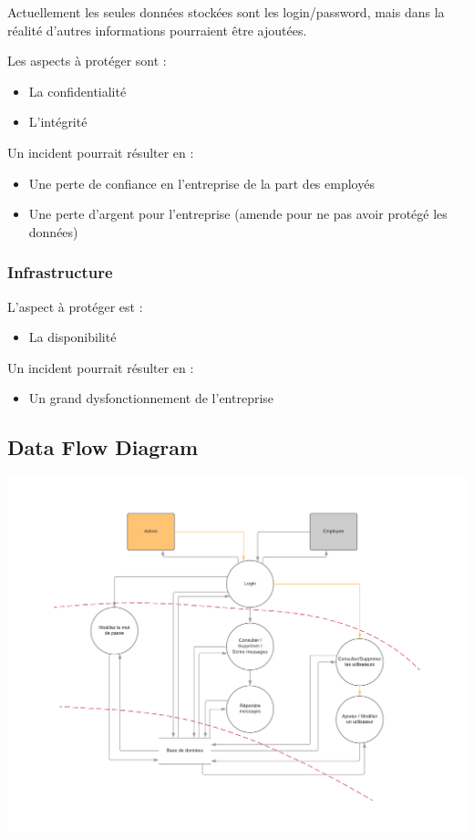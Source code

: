 \documentclass{article}
\begin{document}
Actuellement les seules données stockées sont les login/password, mais
dans la réalité d'autres informations pourraient être ajoutées.

Les aspects à protéger sont :

\begin{itemize}

\item
  La confidentialité
\item
  L'intégrité
\end{itemize}

Un incident pourrait résulter en :

\begin{itemize}

\item
  Une perte de confiance en l'entreprise de la part des employés
\item
  Une perte d'argent pour l'entreprise (amende pour ne pas avoir protégé
  les données)
\end{itemize}

\subsubsection{Infrastructure}

L'aspect à protéger est :

\begin{itemize}

\item
  La disponibilité
\end{itemize}

Un incident pourrait résulter en :

\begin{itemize}

\item
  Un grand dysfonctionnement de l'entreprise
\end{itemize}

\subsection{Data Flow Diagram}

\includegraphics[width=\textwidth]{images/dfd.png}
\end{document}
